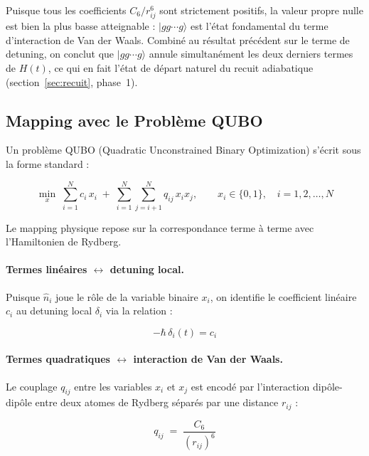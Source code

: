 \documentclass{ceri/sty/rapport}
\begin{document}
Puisque tous les coefficients $C_6/r_{ij}^6$ sont strictement positifs, la valeur propre nulle
est bien la plus basse atteignable : $|gg\cdots g\rangle$ est l'état fondamental du terme
d'interaction de Van der Waals. Combiné au résultat précédent sur le terme de detuning,
on conclut que $|gg\cdots g\rangle$ annule simultanément les deux derniers termes de $H(t)$,
ce qui en fait l'état de départ naturel du recuit adiabatique (section~\ref{sec:recuit}, phase~1).

\subsection{Mapping avec le Problème QUBO}

Un problème QUBO (Quadratic Unconstrained Binary Optimization) s'écrit sous la forme standard :

\begin{equation}
\min_{x} \;\sum_{i=1}^{N} c_i\, x_i \;+\; \sum_{i=1}^{N}\sum_{j=i+1}^{N} q_{ij}\, x_i x_j,
\qquad x_i \in \{0,1\},\quad i = 1,2,\dots,N
\end{equation}

Le mapping physique repose sur la correspondance terme à terme avec l'Hamiltonien de Rydberg.

\paragraph{Termes linéaires $\leftrightarrow$ detuning local.}
Puisque $\hat{n}_i$ joue le rôle de la variable binaire $x_i$, on identifie le coefficient
linéaire $c_i$ au detuning local $\delta_i$ via la relation :

\begin{equation}
-\hbar\,\delta_i(t) = c_i
\end{equation}

\paragraph{Termes quadratiques $\leftrightarrow$ interaction de Van der Waals.}
Le couplage $q_{ij}$ entre les variables $x_i$ et $x_j$ est encodé par l'interaction dipôle-dipôle
entre deux atomes de Rydberg séparés par une distance $r_{ij}$ :

\begin{equation}
q_{ij} \;=\; \frac{C_6}{(r_{ij})^6}
\end{equation}
\end{document}

